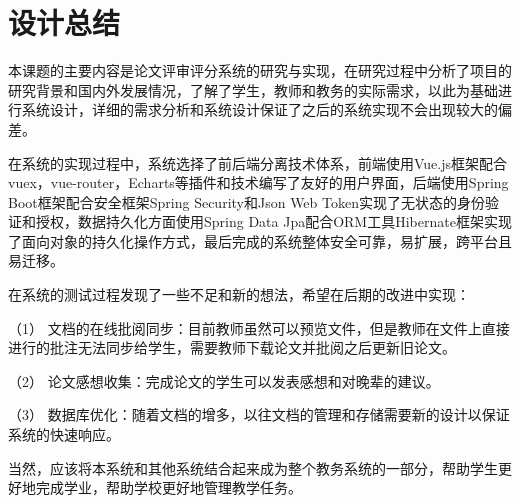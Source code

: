 
\chapter*{\hfill 设计总结 \hfill}
\label{conclusion}

本课题的主要内容是论文评审评分系统的研究与实现，在研究过程中分析了项目的研究背景和国内外发展情况，了解了学生，教师和教务的实际需求，以此为基础进行系统设计，详细的需求分析和系统设计保证了之后的系统实现不会出现较大的偏差。

在系统的实现过程中，系统选择了前后端分离技术体系，前端使用Vue.js框架配合vuex，vue-router，Echarts等插件和技术编写了友好的用户界面，后端使用Spring Boot框架配合安全框架Spring Security和Json Web Token实现了无状态的身份验证和授权，数据持久化方面使用Spring Data Jpa配合ORM工具Hibernate框架实现了面向对象的持久化操作方式，最后完成的系统整体安全可靠，易扩展，跨平台且易迁移。

在系统的测试过程发现了一些不足和新的想法，希望在后期的改进中实现：

（1） 文档的在线批阅同步：目前教师虽然可以预览文件，但是教师在文件上直接进行的批注无法同步给学生，需要教师下载论文并批阅之后更新旧论文。

（2） 论文感想收集：完成论文的学生可以发表感想和对晚辈的建议。

（3） 数据库优化：随着文档的增多，以往文档的管理和存储需要新的设计以保证系统的快速响应。

当然，应该将本系统和其他系统结合起来成为整个教务系统的一部分，帮助学生更好地完成学业，帮助学校更好地管理教学任务。